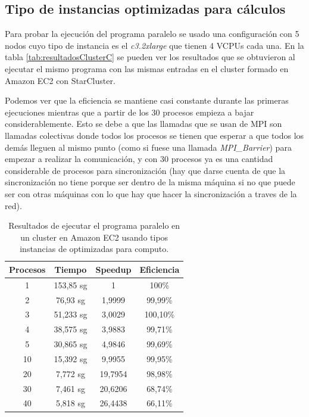\documentclass{article}
\begin{document}
\subsection{Tipo de instancias optimizadas para cálculos}\label{sec:ejC3}
	Para probar la ejecución del programa paralelo se usado una configuración con 5 nodos cuyo tipo de instancia es el \emph{c3.2xlarge} que tienen 4 VCPUs cada una. En la tabla \ref{tab:resultadosClusterC} se pueden ver los resultados que se obtuvieron al ejecutar el mismo programa con las mismas entradas en el cluster formado en Amazon EC2 con StarCluster.

	Podemos ver que la eficiencia se mantiene casi constante durante las primeras ejecuciones mientras que  a partir de los 30 procesos empieza a bajar considerablemente. Esto se debe a que las llamadas que se usan de MPI son llamadas colectivas donde todos los procesos se tienen que esperar a que todos los demás lleguen al mismo punto (como si fuese una llamada \emph{MPI\_Barrier}) para empezar a realizar la comunicación, y con 30 procesos ya es una cantidad considerable de procesos para sincronización (hay que darse cuenta de que la sincronización no tiene porque ser dentro de la misma máquina si no que puede ser con otras máquinas con lo que hay que hacer la sincronización a traves de la red).

\begin{table}[h]
	\begin{center}
		\caption{Resultados de ejecutar el programa paralelo en un cluster en Amazon EC2 usando tipos instancias de optimizadas para computo.}
		\begin{tabular}{|c|c|c|c|}
\hline
\textbf{Procesos} &
\textbf{Tiempo} &
\textbf{Speedup} &
\textbf{Eficiencia} \\ \hline
\hline
 1 &153,85 sg &  1          & 100\% \\ \hline
 2 & 76,93 sg &  1,9999 & 99,99\% \\ \hline 
 3 & 51,233 sg &  3,0029 & 100,10\% \\ \hline 
 4 & 38,575 sg &  3,9883 & 99,71\% \\ \hline
 5 & 30,865 sg &  4,9846 & 99,69\% \\ \hline
10 & 15,392 sg &  9,9955 & 99,95\% \\ \hline
20 & 7,772 sg & 19,7954 & 98,98\% \\ \hline
30 & 7,461 sg &  20,6206& 68,74\% \\ \hline
40 & 5,818 sg & 26,4438 & 66,11\% \\ \hline
		\end{tabular}
		\label{tab:resultadosClusterM}
	\end{center}
\end{table}
\end{document}
